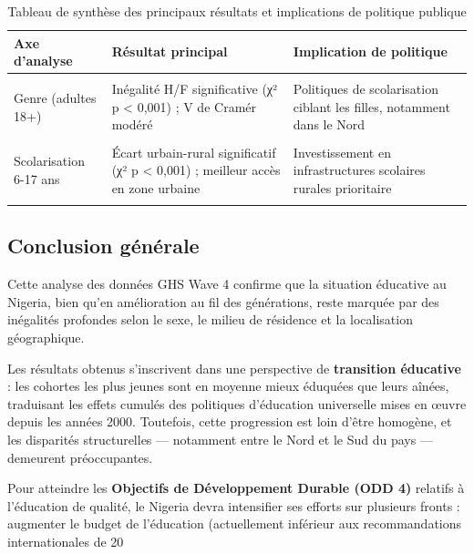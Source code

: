 \documentclass[
  11pt,
]{article}
\begin{document}
\begin{longtable}[t]{>{\raggedright\arraybackslash}p{3cm}>{\raggedright\arraybackslash}p{6cm}>{\raggedright\arraybackslash}p{6cm}}
\caption{\label{tab:synthese-tab}Tableau de synthèse des principaux résultats et implications de politique publique}\\
\toprule
Axe d'analyse & Résultat principal & Implication de politique\\
\midrule
\cellcolor{gray!10}{Distribution générale} & \cellcolor{gray!10}{Forte prévalence du niveau 'Aucun' ; minorité ayant atteint l'enseignement supérieur} & \cellcolor{gray!10}{Nécessité d'alphabétisation des adultes et de renforcement du primaire}\\
Genre (adultes 18+) & Inégalité H/F significative (χ² p < 0,001) ; V de Cramér modéré & Politiques de scolarisation ciblant les filles, notamment dans le Nord\\
\cellcolor{gray!10}{Âge vs. éducation} & \cellcolor{gray!10}{Relation inverse âge-éducation (H Kruskal p < 0,001) : transition éducative en cours} & \cellcolor{gray!10}{Continuité des réformes : effets positifs visibles dans les jeunes cohortes}\\
Scolarisation 6-17 ans & Écart urbain-rural significatif (χ² p < 0,001) ; meilleur accès en zone urbaine & Investissement en infrastructures scolaires rurales prioritaire\\
\cellcolor{gray!10}{Géographie de l'analphabétisme} & \cellcolor{gray!10}{Gradient Nord-Sud marqué ; concentration de l'analphabétisme dans le Nord-Ouest} & \cellcolor{gray!10}{Interventions différenciées par État ; urgence dans les États du Nord}\\
\bottomrule
\end{longtable}
\endgroup{}

\subsection{Conclusion générale}\label{conclusion-guxe9nuxe9rale}

Cette analyse des données GHS Wave 4 confirme que la situation éducative
au Nigeria, bien qu'en amélioration au fil des générations, reste
marquée par des inégalités profondes selon le sexe, le milieu de
résidence et la localisation géographique.

Les résultats obtenus s'inscrivent dans une perspective de
\textbf{transition éducative} : les cohortes les plus jeunes sont en
moyenne mieux éduquées que leurs aînées, traduisant les effets cumulés
des politiques d'éducation universelle mises en œuvre depuis les années
2000. Toutefois, cette progression est loin d'être homogène, et les
disparités structurelles --- notamment entre le Nord et le Sud du pays
--- demeurent préoccupantes.

Pour atteindre les \textbf{Objectifs de Développement Durable (ODD 4)}
relatifs à l'éducation de qualité, le Nigeria devra intensifier ses
efforts sur plusieurs fronts : augmenter le budget de l'éducation
(actuellement inférieur aux recommandations internationales de 20
\end{document}
